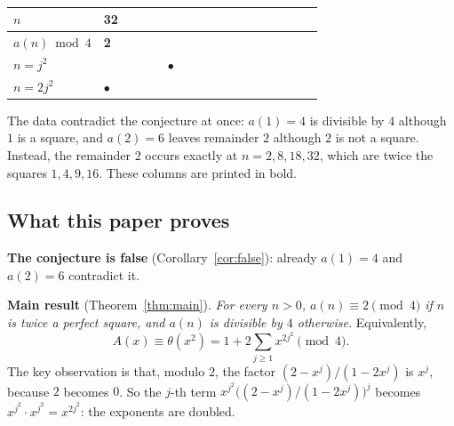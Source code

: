 \documentclass[11pt,a4paper]{article}
\theoremstyle{definition}
\theoremstyle{remark}
\newcommand{\hl}[1]{\textbf{#1}}
\begin{document}
\begin{center}
\begin{tabular}
\bottomrule
\end{tabular}
\\[4pt]
\begin{tabular}{>{\raggedright\arraybackslash}p{6.4em}>{\centering\arraybackslash}p{1.15em}>{\centering\arraybackslash}p{1.15em}>{\centering\arraybackslash}p{1.15em}>{\centering\arraybackslash}p{1.15em}>{\centering\arraybackslash}p{1.15em}>{\centering\arraybackslash}p{1.15em}>{\centering\arraybackslash}p{1.15em}>{\centering\arraybackslash}p{1.15em}>{\centering\arraybackslash}p{1.15em}>{\centering\arraybackslash}p{1.15em}>{\centering\arraybackslash}p{1.15em}>{\centering\arraybackslash}p{1.15em}>{\centering\arraybackslash}p{1.15em}>{\centering\arraybackslash}p{1.15em}>{\centering\arraybackslash}p{1.15em}>{\centering\arraybackslash}p{1.15em}}
\toprule
$n$ & \hl{32} & 33 & 34 & 35 & 36 & 37 & 38 & 39 & 40 & 41 & 42 & 43 & 44 & 45 & 46 & 47 \\ \midrule
$a(n)\bmod 4$ & \hl{2} & 0 & 0 & 0 & 0 & 0 & 0 & 0 & 0 & 0 & 0 & 0 & 0 & 0 & 0 & 0 \\
$n=j^2$ & \hl{} &  &  &  & $\bullet$ &  &  &  &  &  &  &  &  &  &  &  \\
$n=2j^2$ & \hl{$\bullet$} &  &  &  &  &  &  &  &  &  &  &  &  &  &  &  \\
\bottomrule
\end{tabular}
\end{center}

The data contradict the conjecture at once: $a(1)=4$ is divisible by $4$ although $1$ is a square, and $a(2)=6$ leaves
remainder $2$ although $2$ is not a square. Instead, the remainder $2$ occurs exactly at $n=2,8,18,32$, which are
twice the squares $1,4,9,16$. These columns are printed in bold.

\subsection{What this paper proves}
\textbf{The conjecture is false} (Corollary~\ref{cor:false}): already $a(1)=4$ and $a(2)=6$ contradict it.

\textbf{Main result} (Theorem~\ref{thm:main}). \emph{For every $n>0$, $a(n)\equiv2\pmod4$ if $n$ is twice a perfect
square, and $a(n)$ is divisible by $4$ otherwise.} Equivalently,
\[
A(x)\equiv\theta(x^2)=1+2\sum_{j\ge1}x^{2j^2}\pmod 4 .
\]
The key observation is that, modulo $2$, the factor $(2-x^j)/(1-2x^j)$ is $x^j$, because $2$ becomes $0$. So the
$j$-th term $x^{j^2}\bigl((2-x^j)/(1-2x^j)\bigr)^j$ becomes $x^{j^2}\cdot x^{j^2}=x^{2j^2}$: the exponents are doubled.
\end{document}
